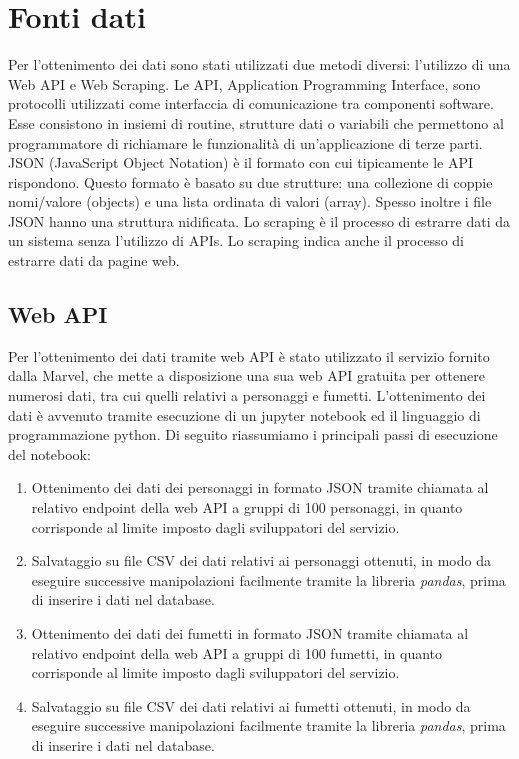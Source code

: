 \documentclass[
12pt, %
a4paper, %
oneside, %
headinclude,footinclude, %
BCOR5mm, %
]{scrartcl}
\begin{document}

\section{Fonti dati}
Per l'ottenimento dei dati sono stati utilizzati due metodi diversi: l'utilizzo di una Web API e Web Scraping.
Le API, Application Programming Interface, sono protocolli utilizzati come interfaccia di comunicazione tra componenti software. Esse consistono in insiemi di routine, strutture dati o variabili che permettono al programmatore di richiamare le funzionalità di un’applicazione di terze parti. \cite{BigDataBook}
JSON (JavaScript Object Notation) è il formato con cui tipicamente le API rispondono. Questo formato è basato su due strutture: una collezione di coppie nomi/valore (objects) e una lista ordinata di valori (array). Spesso inoltre i file JSON hanno una struttura nidificata.
Lo scraping è il processo di estrarre dati da un sistema senza l'utilizzo di APIs. Lo scraping indica anche il processo di estrarre dati da pagine web.

\subsection{Web API}
Per l'ottenimento dei dati tramite web API è stato utilizzato il servizio fornito dalla Marvel, che mette a disposizione una sua web API gratuita per ottenere numerosi dati, tra cui quelli relativi a personaggi e fumetti.
L'ottenimento dei dati è avvenuto tramite esecuzione di un jupyter notebook ed il linguaggio di programmazione python.
Di seguito riassumiamo i principali passi di esecuzione del notebook:
\begin{enumerate}
\item Ottenimento dei dati dei personaggi in formato JSON tramite chiamata al relativo endpoint della web API a gruppi di 100 personaggi, in quanto corrisponde al limite imposto dagli sviluppatori del servizio.
\item Salvataggio su file CSV dei dati relativi ai personaggi ottenuti, in modo da eseguire successive manipolazioni facilmente tramite la libreria \textit{pandas}, prima di inserire i dati nel database.
\item Ottenimento dei dati dei fumetti in formato JSON tramite chiamata al relativo endpoint della web API a gruppi di 100 fumetti, in quanto corrisponde al limite imposto dagli sviluppatori del servizio.
\item Salvataggio su file CSV dei dati relativi ai fumetti ottenuti, in modo da eseguire successive manipolazioni facilmente tramite la libreria \textit{pandas}, prima di inserire i dati nel database.
\end{enumerate}
\end{document}
